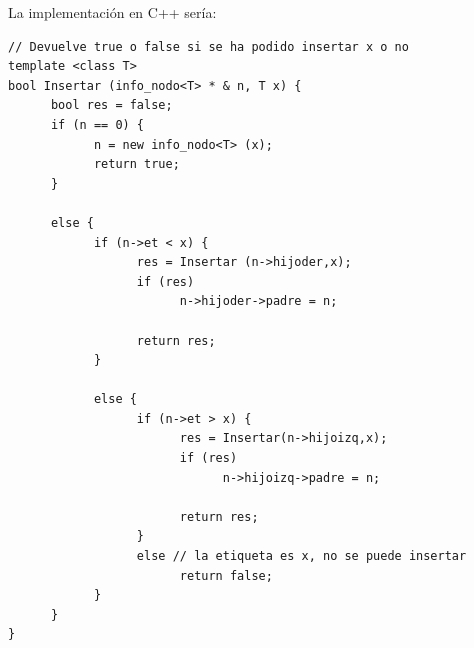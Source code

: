 \documentclass[10pt,a4paper,spanish]{report}
\begin{document}
\noindent
La implementación en C++ sería:

\begin{verbatim}
// Devuelve true o false si se ha podido insertar x o no
template <class T>
bool Insertar (info_nodo<T> * & n, T x) {
      bool res = false;
      if (n == 0) {
            n = new info_nodo<T> (x);
            return true;
      }

      else {
            if (n->et < x) {
                  res = Insertar (n->hijoder,x);
                  if (res)
                        n->hijoder->padre = n;

                  return res;
            }

            else {
                  if (n->et > x) {
                        res = Insertar(n->hijoizq,x);
                        if (res)
                              n->hijoizq->padre = n;

                        return res;
                  }
                  else // la etiqueta es x, no se puede insertar
                        return false;
            }
      }
}
\end{verbatim}
\end{document}
